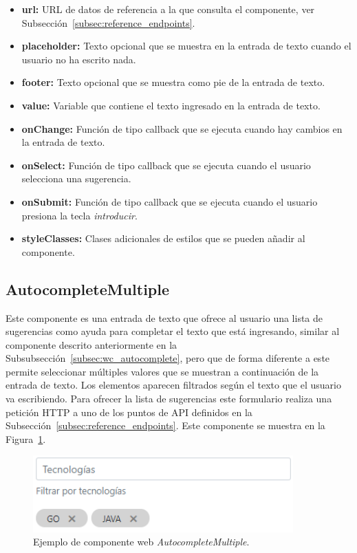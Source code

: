 \documentclass[a4paper, 12pt]{book}
\begin{document}
    \begin{itemize}
        \item \textbf{url:} URL de datos de referencia a la que consulta el componente, ver Subsección~\ref{subsec:reference_endpoints}.
        \item \textbf{placeholder:} Texto opcional que se muestra en la entrada de texto cuando el usuario no ha escrito nada.
        \item \textbf{footer:} Texto opcional que se muestra como pie de la entrada de texto.
        \item \textbf{value:} Variable que contiene el texto ingresado en la entrada de texto.
        \item \textbf{onChange:} Función de tipo callback que se ejecuta cuando hay cambios en la entrada de texto.
        \item \textbf{onSelect:} Función de tipo callback que se ejecuta cuando el usuario selecciona una sugerencia.
        \item \textbf{onSubmit:} Función de tipo callback que se ejecuta cuando el usuario presiona la tecla \emph{introducir}.
        \item \textbf{styleClasses:} Clases adicionales de estilos que se pueden añadir al componente.
    \end{itemize}

    \subsection{AutocompleteMultiple}
    \label{subsec:wc_autocomplete_multiple}
    Este componente es una entrada de texto que ofrece al usuario una lista de sugerencias como ayuda para completar el texto que está ingresando,
    similar al componente descrito anteriormente en la Subsubsección~\ref{subsec:wc_autocomplete}, pero que de forma diferente a este permite seleccionar múltiples valores que se muestran a continuación de la entrada de texto.
    Los elementos aparecen filtrados según el texto que el usuario va escribiendo.
    Para ofrecer la lista de sugerencias este formulario realiza una petición HTTP a uno de los puntos de API definidos en la Subsección~\ref{subsec:reference_endpoints}.
    Este componente se muestra en la Figura~\ref{fig:component_autocomplete_multiple}.

    \begin{figure}
        \centering
        \includegraphics[width=10cm, keepaspectratio]{img/AutocompleteMultiple.PNG}
        \caption{Ejemplo de componente web \emph{AutocompleteMultiple}.}\label{fig:component_autocomplete_multiple}
    \end{figure}
\end{document}
